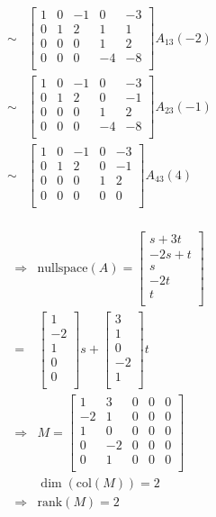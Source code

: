 \documentclass{article}
\def\rank{\text{rank}}
\begin{document}
\begin{equation*}
\begin{split}
\sim&\begin{bmatrix}
1&0&-1&0&-3\\
0&1&2&1&1\\
0&0&0&1&2\\
0&0&0&-4&-8\\
\end{bmatrix}A_{13}(-2)\\
\sim&\begin{bmatrix}
1&0&-1&0&-3\\
0&1&2&0&-1\\
0&0&0&1&2\\
0&0&0&-4&-8\\
\end{bmatrix}A_{23}(-1)\\
\sim&\begin{bmatrix}
1&0&-1&0&-3\\
0&1&2&0&-1\\
0&0&0&1&2\\
0&0&0&0&0\\
\end{bmatrix}A_{43}(4)\\
\end{split}
\end{equation*}

\begin{equation*}
\begin{split}
\Rightarrow &\text{nullspace}(A)=\begin{bmatrix}
s+3t\\
-2s+t\\
s\\
-2t\\
t\\
\end{bmatrix}\\
=&\begin{bmatrix}
1\\
-2\\
1\\
0\\
0\\
\end{bmatrix}s+\begin{bmatrix}
3\\
1\\
0\\
-2\\
1\\
\end{bmatrix}t\\
\Rightarrow &M=\begin{bmatrix}
1&3&0&0&0\\
-2&1&0&0&0\\
1&0&0&0&0\\
0&-2&0&0&0\\
0&1&0&0&0\\
\end{bmatrix}\\
&\dim(\text{col}(M))=2\\
\Rightarrow&\rank(M)=2\\
\end{split}
\end{equation*}
\end{document}
